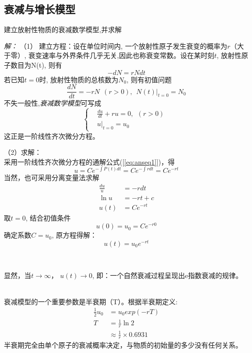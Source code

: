 \subsection{衰减与增长模型}
\begin{example} 
	建立放射性物质的衰减数学模型,并求解
\end{example}
	\emph{解：} （1） 建立方程：设在单位时间内, 一个放射性原子发生衰变的概率为$r$（大于零）, 衰变速率与外界条件几乎无关,因此也称衰变常数。设在某时刻$t$, 放射性原子数目为N(t), 则有
		\begin{equation*}
			-dN	= r N dt
		\end{equation*}	 
	若已知$t=0$时, 放射性物质的总核数为$N_0$, 则有初值问题
	\begin{equation*}
		\frac{dN}{dt}	= - rN ~~(r>0),~~ N(t)|_{t=0} = N_0
		\end{equation*}
	不失一般性,\emph{衰减数学模型}可写成
	\begin{equation}
	\boxed{\left\{\begin{aligned}
		&\frac{du}{dt} + ru =0, ~~(r>0)~~  \\
		&u|_{t=0} = u_0 
	\end{aligned}\right.} 
	\end{equation}
    这正是一阶线性齐次微分方程。

	（2）求解：\\
采用一阶线性齐次微分方程的通解公式([\ref{eq:anseq1}])，得
		\begin{equation*}
			u=Ce^{-\int P(t)dt}=Ce^{-\int rdt}= Ce^{- r t}
		\end{equation*}
当然，也可采用分离变量法求解
	$$\begin{aligned}
	\frac{du}{u} &= - rdt\\
	\ln u &=-rt+c\\
	u(t)      &=Ce^{- r t}
	\end{aligned}$$
	取$t=0$, 结合初值条件
	\begin{equation*}
		u(0)=u_0=Ce^{- r 0} 
	\end{equation*}
	确定系数$C=u_0$, 原方程得解：
	\begin{equation}
	\boxed{u(t)= u_0 e^{- r t}}
	\end{equation}

	~~\\ 
	\begin{hint}
	显然，当$t\rightarrow \infty$， $u(t)\rightarrow 0$, 即：一个自然衰减过程呈现出e指数衰减的规律。
	\end{hint}
	
~~\\
衰减模型的一个重要参数是半衰期（T）。根据半衰期定义:
	\begin{align*}
		\frac{1}{2}u_0 &= u_0 exp(-rT)\\
		T &=\frac{1}{r} \ln 2  \\ &\approx \frac{1}{r} \times 0.6931	
		\end{align*}
	半衰期完全由单个原子的衰减概率决定，与物质的初始量的多少没有任何关系。
		
